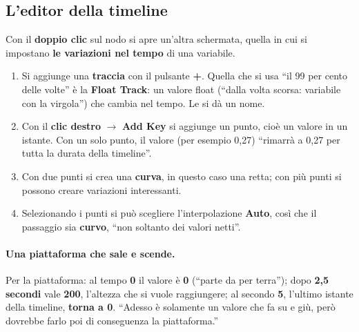 \subsection{L'editor della timeline}

Con il \textbf{doppio clic} sul nodo si apre un'altra schermata, quella in cui
si impostano \textbf{le variazioni nel tempo} di una variabile.
\begin{enumerate}
  \item Si aggiunge una \textbf{traccia} con il pulsante \textbf{+}. Quella che
        si usa ``il 99 per cento delle volte'' è la \textbf{Float Track}: un
        valore float (``dalla volta scorsa: variabile con la virgola'') che
        cambia nel tempo. Le si dà un nome.
  \item Con il \textbf{clic destro} $\rightarrow$ \textbf{Add Key} si aggiunge
        un punto, cioè un valore in un istante. Con un solo punto, il valore
        (per esempio 0,27) ``rimarrà a 0,27 per tutta la durata della
        timeline''.
  \item Con due punti si crea una \textbf{curva}, in questo caso una retta; con
        più punti si possono creare variazioni interessanti.
  \item Selezionando i punti si può scegliere l'interpolazione \textbf{Auto},
        così che il passaggio sia \textbf{curvo}, ``non soltanto dei valori
        netti''.
\end{enumerate}

\paragraph{Una piattaforma che sale e scende.} Per la piattaforma: al tempo
\textbf{0} il valore è \textbf{0} (``parte da per terra''); dopo \textbf{2,5
secondi} vale \textbf{200}, l'altezza che si vuole raggiungere; al secondo
\textbf{5}, l'ultimo istante della timeline, \textbf{torna a 0}. ``Adesso è
solamente un valore che fa su e giù, però dovrebbe farlo poi di conseguenza la
piattaforma.''

